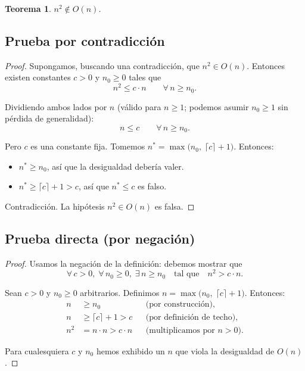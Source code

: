 \documentclass[11pt, letterpaper]{article}
\theoremstyle{definition}
\theoremstyle{plain}
\newtheorem{theorem}{Teorema}[section]
\theoremstyle{remark}
\begin{document}
\begin{theorem}\label{thm:n2-not-on}
  $n^2 \notin O(n)$.
\end{theorem}

\subsection{Prueba por contradicción}

\begin{proof}
  Supongamos, buscando una contradicción, que $n^2 \in O(n)$.
  Entonces existen constantes $c > 0$ y $n_0 \geq 0$ tales que
  \[
    n^2 \leq c \cdot n \qquad \forall\, n \geq n_0.
  \]

  Dividiendo ambos lados por $n$ (válido para $n \geq 1$; podemos
  asumir $n_0 \geq 1$ sin pérdida de generalidad):
  \[
    n \leq c \qquad \forall\, n \geq n_0.
  \]

  Pero $c$ es una constante fija. Tomemos
  $n^{*} = \max\!\big(n_0,\; \lceil c \rceil + 1\big)$.
  Entonces:
  \begin{itemize}[nosep]
    \item $n^{*} \geq n_0$, así que la desigualdad debería valer.
    \item $n^{*} \geq \lceil c \rceil + 1 > c$, así que $n^{*} \leq c$ es falso.
  \end{itemize}

  Contradicción. La hipótesis $n^2 \in O(n)$ es falsa.
\end{proof}

\subsection{Prueba directa (por negación)}

\begin{proof}
  Usamos la negación de la definición: debemos mostrar que
  \[
    \forall\, c > 0,\;
    \forall\, n_0 \geq 0,\;
    \exists\, n \geq n_0
    \quad\text{tal que}\quad
    n^2 > c \cdot n.
  \]

  Sean $c > 0$ y $n_0 \geq 0$ arbitrarios. Definimos
  $n = \max\!\big(n_0,\; \lceil c \rceil + 1\big)$.
  Entonces:
  \begin{align*}
    n &\geq n_0 &&\text{(por construcción),} \\
    n &\geq \lceil c \rceil + 1 > c &&\text{(por definición de techo),} \\
    n^2 &= n \cdot n > c \cdot n &&\text{(multiplicamos por } n > 0\text{).}
  \end{align*}

  Para cualesquiera $c$ y $n_0$ hemos exhibido un $n$ que viola la
  desigualdad de $O(n)$.
\end{proof}
\end{document}
